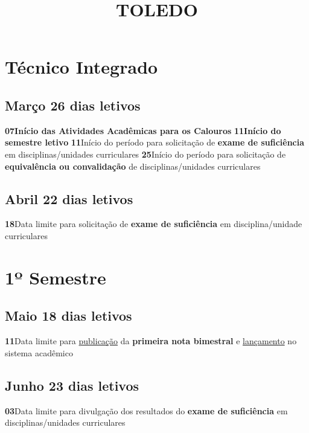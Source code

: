 \documentclass[thesis]{hmcposter}
\author{ }
\title{TOLEDO}
\begin{document}
\begin{poster}
\normalsize
				\section{\color{hmcorange}Técnico Integrado}\subsection{Março \hfill 26 dias letivos}\textbf{07}\qquad \textbf{Início das Atividades Acadêmicas para os Calouros} \newline \null\textbf{11}\qquad \textbf{Início do semestre letivo} \newline \null\textbf{11}\qquad Início do período para solicitação de \textbf{exame de suficiência} em disciplinas/unidades curriculares \newline \null\textbf{25}\qquad Início do período para solicitação de \textbf{equivalência ou convalidação} de disciplinas/unidades curriculares \newline \null\subsection{Abril \hfill 22 dias letivos}\textbf{18}\qquad Data limite para solicitação de \textbf{exame de suficiência} em disciplina/unidade curriculares \newline \null\vfill\null
\columnbreak
\section{\hfill \color{hmcorange}1º Semestre}
\subsection{Maio \hfill 18 dias letivos}\textbf{11}\qquad Data limite para \underline{publicação} da \textbf{primeira nota bimestral} e \underline{lançamento} no sistema acadêmico \newline \null\subsection{Junho \hfill 23 dias letivos}\textbf{03}\qquad Data limite para divulgação dos resultados do \textbf{exame de suficiência} em disciplinas/unidades curriculares \newline \null\newpage

\end{poster}
\end{document}
